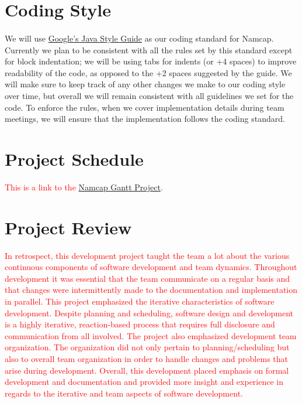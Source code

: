 \documentclass{article}
\begin{document}
\section{Coding Style}

\paragraph{}

We will use \textcolor{red}{\href{https://google.github.io/styleguide/javaguide.html}{Google's Java Style Guide}} as our coding standard for Namcap. Currently we plan to be consistent with all the rules set by this standard except for block indentation; we will be using tabs for indents (or +4 spaces) to improve readability of the code, as opposed to the +2 spaces suggested by the guide. We will make sure to keep track of any other changes we make to our coding style over time, but overall we will remain consistent with all guidelines we set for the code. To enforce the rules, when we cover implementation details during team meetings, we will ensure that the implementation follows the coding standard.

\section{Project Schedule}

\textcolor{red}{This is a link to the \href{run:NamcapGanttProject.gan}{Namcap Gantt Project}.}

\section{Project Review}
\textcolor{red}{In retrospect, this development project taught the team a lot about the various continuous components of software development and team dynamics. Throughout development it was essential that the team communicate on a regular basis and that changes were intermittently made to the documentation and implementation in parallel. This project emphasized the iterative characteristics of software development. Despite planning and scheduling, software design and development is a highly iterative, reaction-based process that requires full disclosure and communication from all involved. The project also emphasized development team organization. The organization did not only pertain to planning/scheduling but also to overall team organization in order to handle changes and problems that arise during development. Overall, this development placed emphasis on formal development and documentation and provided more insight and experience in regards to the iterative and team aspects of software development.}
\end{document}
